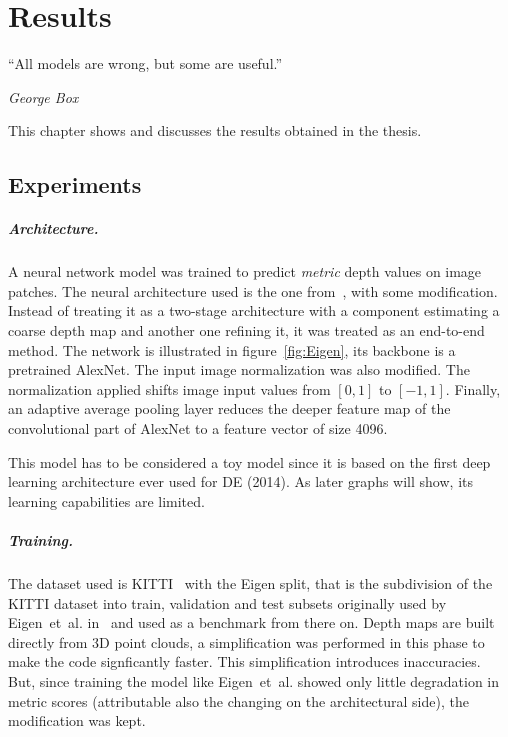 \chapter{Results}
\label{ch:results}

\epigraph{\enquote{All models are wrong, but some are useful.}}{\emph{George Box}}

This chapter shows and discusses the results obtained in the thesis.

\section{Experiments}
\label{sec:experiments}

\paragraph{Architecture.}
A neural network model was trained to predict \textit{metric} depth values on image patches.
The neural architecture used is the one from~\cite{Eigen}, with some modification.
Instead of treating it as a two-stage architecture with a component estimating a coarse depth map and another one refining it, it was treated as an end-to-end method.
The network is illustrated in figure~\ref{fig:Eigen}, its backbone is a pretrained AlexNet.
The input image normalization was also modified.
The normalization applied shifts image input values from $[0, 1]$ to $[-1, 1]$.
Finally, an adaptive average pooling layer reduces the deeper feature map of the convolutional part of AlexNet to a feature vector of size 4096.

This model has to be considered a toy model since it is based on the first deep learning architecture ever used for DE (2014).
As later graphs will show, its learning capabilities are limited.

\paragraph{Training.}
The dataset used is KITTI~\cite{KITTI} with the Eigen split, that is the subdivision of the KITTI dataset into train, validation and test subsets originally used by Eigen~et~al. in~\cite{Eigen} and used as a benchmark from there on.
Depth maps are built directly from 3D point clouds, a simplification was performed in this phase to make the code signficantly faster.
This simplification introduces inaccuracies.
But, since training the model like Eigen~et~al. showed only little degradation in metric scores (attributable also the changing on the architectural side), the modification was kept.


